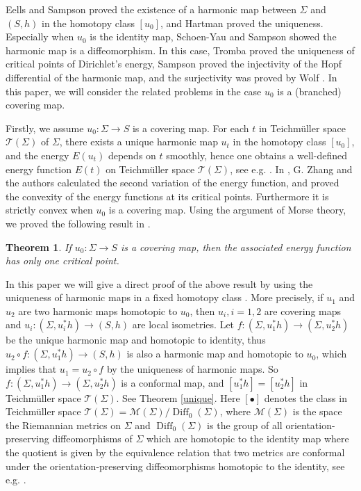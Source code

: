 \documentclass[11pt]{amsart}
\numberwithin{equation}{section}
\def\mc{\mathcal}
\theoremstyle{plain}
\newtheorem{thm}{Theorem}[section]
\theoremstyle{definition}
\theoremstyle{definition}
\def\op{\operatorname}
\begin{document}
 Eells and Sampson \cite{ES} proved the existence of  a harmonic map between $\Sigma$ and $(S,h)$ in the   homotopy class $[u_0]$, and Hartman \cite{Hart} proved the uniqueness. Especially when  $u_0$ is the identity map, Schoen-Yau \cite{SY0} and Sampson \cite{Sampson} showed the harmonic map is a diffeomorphism. In this case, Tromba \cite{Tromba} proved the uniqueness of critical points of Dirichlet's energy, Sampson \cite{Sampson} proved the injectivity of the Hopf differential of the harmonic map, and  the surjectivity was proved by Wolf \cite{Wolf0}. In this paper, we will  consider the related problems in the case $u_0$ is a (branched) covering map. 

Firstly, we assume $u_0:\Sigma\to S$ is a covering map. For each $t$ in Teichm\"uller space $\mc{T}(\Sigma)$ of $\Sigma$, there exists a unique harmonic map $u_t$ in the homotopy class $[u_0]$, and the energy $E(u_t)$ depends on $t$ smoothly, hence one obtains a well-defined energy function $E(t)$ on Teichm\"uller space $\mc{T}(\Sigma)$, see e.g. \cite{Tromba}. In \cite{KWZ}, G. Zhang and the authors calculated the second variation of the energy function, and proved the convexity of the energy functions at its critical points.  Furthermore it is strictly convex  when $u_0$ is a covering map. Using the argument of Morse theory, we proved the following result in {\cite[Corollary 0.2]{KWZ}}.
\begin{thm}\label{thm1}
	If $u_0:\Sigma\to S$ is a covering map, then the associated energy function has only one critical point.
\end{thm}
In this paper we will give a direct proof of the above result by using the uniqueness of harmonic maps in a fixed homotopy class \cite{Hart}. More precisely, if $u_1$ and $u_2$ are two harmonic maps homotopic to $u_0$, then $u_i,i=1,2$ are covering maps and $u_i: (\Sigma, u_i^*h)\to (S,h)$ are local isometries. Let $f:(\Sigma,u_1^*h)\to (\Sigma,u_2^*h)$ be the unique harmonic map and homotopic to identity, thus $u_2\circ f:(\Sigma,u_1^*h)\to (S,h)$ is also a harmonic map and homotopic to $u_0$, which implies that $u_1=u_2\circ f$ by the uniqueness of harmonic maps. So $f:(\Sigma,u_1^*h)\to (\Sigma,u_2^*h)$ is a conformal map, and $[u_1^*h]=[u_2^*h]$ in Teichm\"uller space $\mc{T}(\Sigma)$. See Theorem \ref{unique}.
Here  $[\bullet]$ denotes the  class in Teichm\"uller space  $\mc{T}(\Sigma)=\mc{M}(\Sigma)/\op{Diff}_0(\Sigma)$, where $\mc{M}(\Sigma)$ is the space the Riemannian metrics   on $\Sigma$ and $\op{Diff}_0(\Sigma)$ is the group of all  orientation-preserving diffeomorphisms of $\Sigma$ which are homotopic to the identity map where the quotient is given by the equivalence relation that two metrics are conformal under the orientation-preserving diffeomorphisms homotopic to the identity, see e.g. \cite[Theorem 1.8]{IT}. 
\end{document}
